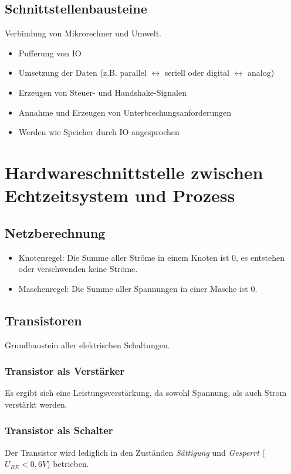 \subsection{Schnittstellenbausteine}
Verbindung von Mikrorechner und Umwelt.
\begin{itemize}
	\item Pufferung von IO
	\item Umsetzung der Daten (z.B. parallel $\leftrightarrow$ seriell oder digital $\leftrightarrow$ analog)
	\item Erzeugen von Steuer- und Handshake-Signalen
	\item Annahme und Erzeugen von Unterbrechungsanforderungen
	\item Werden wie Speicher durch IO angesprochen
\end{itemize}



\section{Hardwareschnittstelle zwischen Echtzeitsystem und Prozess}

\subsection{Netzberechnung}
\begin{itemize}
	\item Knotenregel: Die Summe aller Ströme in einem Knoten ist $0$, es entstehen oder verschwenden keine Ströme.
	\item Maschenregel: Die Summe aller Spannungen in einer Masche ist $0$.
\end{itemize}


\subsection{Transistoren}
Grundbaustein aller elektrischen Schaltungen.

\subsubsection{Transistor als Verstärker}
Es ergibt sich eine Leistungsverstärkung, da sowohl Spannung, als auch Strom verstärkt werden.


\subsubsection{Transistor als Schalter}
Der Transistor wird lediglich in den Zuständen \textit{Sättigung} und \textit{Gesperrt} ($U_{BE} < 0,6 V$) betrieben.


